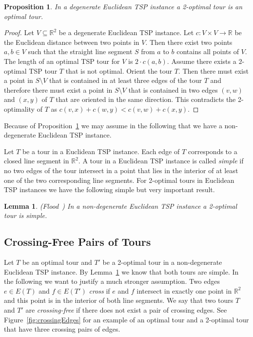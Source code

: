 \documentclass[a4paper, 11pt]{article}
\newtheorem{proposition}[theorem]{Proposition}
\newtheorem{lemma}[theorem]{Lemma}
\begin{document}
\begin{proposition}
In a degenerate Euclidean TSP instance a 2-optimal tour is an optimal tour.
\label{prop:degenerate-case}
\end{proposition}
\begin{proof}
Let $V\subseteq \mathbb{R}^2$ be a degenerate Euclidean TSP instance. 
Let $c:V\times V \to \mathbb{R}$ be the Euclidean distance between two points in $V$.
Then there exist two points $a, b\in V$ such that the straight line segment $S$ from $a$ to $b$ contains all points of $V$. 
The length of an optimal TSP tour for $V$ is $2\cdot c(a,b)$. Assume there exists a $2$-optimal TSP tour $T$ that is not optimal. Orient the tour $T$. Then there must exist a point 
in $S\setminus V$ that is contained in at least three edges of the tour $T$ and therefore there must exist a point in $S\setminus V$ 
that is contained in two edges $(v,w)$ and $(x,y)$ of $T$ that are oriented in the same direction. This contradicts the 2-optimality of $T$ as 
$c(v,x) + c(w,y) < c(v,w) + c(x,y)$.   
\end{proof}

Because of Proposition~\ref{prop:degenerate-case} we may assume in the following that we have a non-degenerate Euclidean TSP instance. 

Let $T$ be a tour in a Euclidean TSP instance. Each edge of $T$ corresponds to a closed line segment in $\mathbb{R}^2$. 
A tour in a Euclidean TSP instance is called \emph{simple} if no two edges of the tour intersect in a point that lies in the interior of at least one
of the two corresponding line segments. 
For 2-optimal tours in Euclidean TSP instances we have the following simple but very important result. 

\begin{lemma}(Flood~\cite{Flo1956}) In a non-degenerate Euclidean TSP instance a 2-optimal tour is simple.
\label{lemma:nocrossing}
\end{lemma}












\subsection{Crossing-Free Pairs of Tours}
\label{sec:uncrossing}

Let $T$ be an optimal tour and $T'$ be a 2-optimal tour in a non-degenerate Euclidean TSP instance. 
By Lemma~\ref{lemma:nocrossing} we know that both tours are simple. In the following we want to justify a much stronger assumption.
Two edges $e\in E(T)$ and $f\in E(T')$ \emph{cross} if $e$ and $f$ intersect in exactly one point in $\mathbb{R}^2$ 
and this point is in the interior of both line segments.  
We say that two tours $T$ and $T'$ are \emph{crossing-free} if there does not exist a pair of crossing edges.
See Figure~\ref{fig:crossingEdges} for an example of an optimal tour and a 2-optimal tour that have three crossing pairs of edges.
\end{document}
